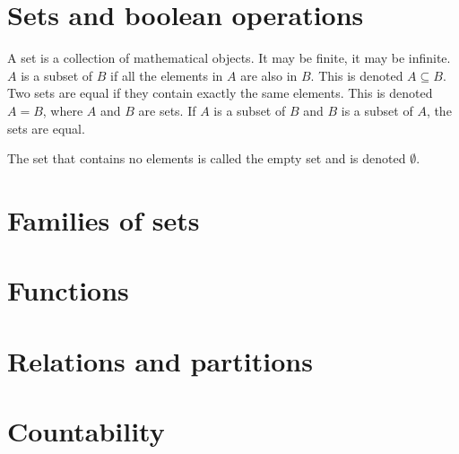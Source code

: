 \section{Sets and boolean operations}

A set is a collection of mathematical objects. It may be finite, it may be infinite.
\( A \) is a subset of \( B \) if all the elements in \( A \) are also in \( B \). This is denoted \( A \subseteq B \).
Two sets are equal if they contain exactly the same elements. This is denoted \( A = B \), where \( A \) and \( B \) are sets. If \( A \) is a subset of \( B \) and \( B \) is a subset of \( A \), the sets are equal.

The set that contains no elements is called the empty set and is denoted \( \emptyset \).
\section{Families of sets}
\section{Functions}
\section{Relations and partitions}
\section{Countability}
